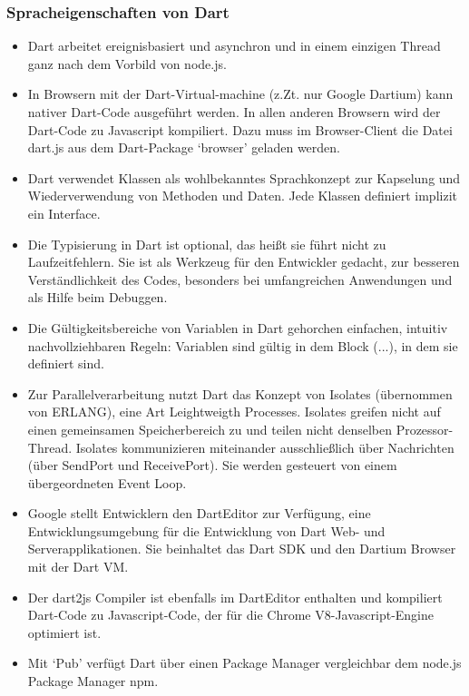 \subsubsection{Spracheigenschaften von Dart}\label{s.Spracheigenschaften von Dart}
\begin{itemize}

\item Dart arbeitet ereignisbasiert und asynchron und in einem einzigen Thread ganz nach dem Vorbild von node.js.
\item  In Browsern mit der Dart-Virtual-machine (z.Zt. nur Google Dartium) kann nativer Dart-Code ausgeführt werden. In allen anderen Browsern wird der Dart-Code zu Javascript kompiliert. Dazu muss im Browser-Client die Datei dart.js aus dem Dart-Package ‘browser’ geladen werden.
 
\item Dart verwendet Klassen als wohlbekanntes Sprachkonzept zur Kapselung und Wiederverwendung von Methoden und Daten. Jede Klassen definiert implizit ein Interface.
\item Die Typisierung in Dart ist optional, das heißt sie führt nicht zu Laufzeitfehlern. Sie ist als Werkzeug für den Entwickler gedacht, zur besseren Verständlichkeit des Codes, besonders bei umfangreichen Anwendungen und als Hilfe beim Debuggen.
\item Die Gültigkeitsbereiche von Variablen in Dart gehorchen einfachen, intuitiv nachvollziehbaren Regeln: Variablen sind gültig in dem Block ({...}), in dem sie definiert sind.
\item
Zur Parallelverarbeitung nutzt Dart das Konzept von Isolates (übernommen von ERLANG), eine Art Leightweigth Processes. Isolates greifen nicht auf einen gemeinsamen Speicherbereich zu und teilen nicht denselben Prozessor-Thread. Isolates kommunizieren miteinander ausschließlich über Nachrichten (über SendPort und ReceivePort). Sie werden gesteuert von einem übergeordneten Event Loop.
\item Google stellt Entwicklern den DartEditor zur Verfügung, eine Entwicklungsumgebung für die Entwicklung von Dart Web- und Serverapplikationen. Sie beinhaltet das Dart SDK und den Dartium Browser mit der Dart VM.
\item Der dart2js Compiler ist ebenfalls im DartEditor enthalten und kompiliert Dart-Code zu Javascript-Code, der für die Chrome V8-Javascript-Engine optimiert ist.
\item Mit ‘Pub’ verfügt Dart über einen Package Manager vergleichbar dem node.js Package Manager npm.
\end{itemize}
\cite{dartvsjs}\cite{builddartapps}

